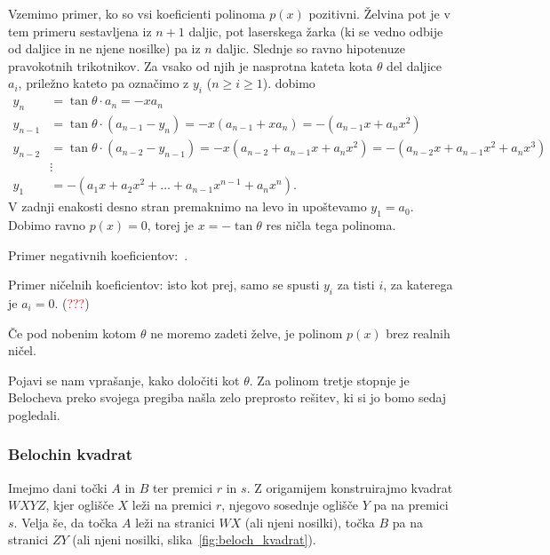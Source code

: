 \begin{dokaz}
    Vzemimo primer, ko so vsi koeficienti polinoma $p(x)$ pozitivni. Želvina pot je v tem primeru sestavljena iz $n+1$ daljic, pot laserskega žarka (ki se vedno odbije od daljice in ne njene nosilke) pa iz $n$ daljic. Slednje so ravno hipotenuze pravokotnih trikotnikov. Za vsako od njih je nasprotna kateta kota $\theta$ del daljice $a_i$, priležno kateto pa označimo z $y_i$ ($ n \geq i \geq 1$). dobimo
    \begin{align*}
        y_n &= \tan \theta \cdot a_n = - x a_n \\
        y_{n-1} &= \tan \theta \cdot (a_{n-1} - y_n) = - x (a_{n-1} + x a_n) = - (a_{n-1} x + a_n x^2)\\
        y_{n-2} &= \tan \theta \cdot (a_{n-2} - y_{n-1}) = - x (a_{n-2} + a_{n-1} x + a_n x^2) = - (a_{n-2} x + a_{n-1} x^2 + a_n x^3) \\
        &\vdots \\
        y_1 &= - (a_1 x + a_2 x^2 + \ldots + a_{n-1} x^{n-1} + a_n x^n).
    \end{align*}
    V zadnji enakosti desno stran premaknimo na levo in upoštevamo $y_1 = a_0$. Dobimo ravno $p(x) = 0$, torej je $x = - \tan \theta$ res ničla tega polinoma.

    Primer negativnih koeficientov:~\cite[str.\ 36]{zore2022}.

    Primer ničelnih koeficientov: isto kot prej, samo se spusti $y_i$ za tisti $i$, za katerega je $a_i = 0$. (\textcolor{red}{???})
\end{dokaz}

Če pod nobenim kotom $\theta$ ne moremo zadeti želve, je polinom $p(x)$ brez realnih ničel.

Pojavi se nam vprašanje, kako določiti kot $\theta$. Za polinom tretje stopnje je Belocheva preko svojega pregiba našla zelo preprosto rešitev, ki si jo bomo sedaj pogledali.

\subsubsection{Belochin kvadrat}

Imejmo dani točki $A$ in $B$ ter premici $r$ in $s$. Z origamijem konstruirajmo kvadrat $WXYZ$, kjer oglišče $X$ leži na premici $r$, njegovo sosednje oglišče $Y$ pa na premici $s$. Velja še, da točka $A$ leži na stranici $WX$ (ali njeni nosilki), točka $B$ pa na stranici $ZY$ (ali njeni nosilki, slika~\ref{fig:beloch_kvadrat}).

